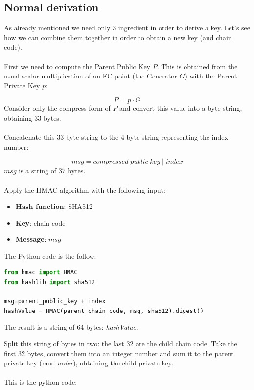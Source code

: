 \subsection{Normal derivation}

As already mentioned we need only 3 ingredient in order to derive a key. Let's see how we can combine them together in order to obtain a new key (and chain code). \\ \\
First we need to compute the Parent Public Key $P$. This is obtained from the usual scalar multiplication of an EC point (the Generator $G$) with the Parent Private Key $p$:

\begin{equation*}
P=p\cdot G
\end{equation*}
Consider only the compress form of $P$ and convert this value into a byte string, obtaining 33 bytes.
\\ \\
Concatenate this 33 byte string to the 4 byte string representing the index number:

\begin{equation*}
msg = compressed \; public\;key \;|\; index
\end{equation*}
$msg$ is a string of $37$ bytes. \\ \\
Apply the HMAC algorithm with the following input:

\begin{itemize}[label=$\odot$]
	\item \textbf{Hash function}: SHA512
	\item \textbf{Key}: chain code
	\item \textbf{Message}: $msg$
\end{itemize}
The Python code is the follow:
\begin{lstlisting}[language=Python]
from hmac import HMAC
from hashlib import sha512

msg=parent_public_key + index
hashValue = HMAC(parent_chain_code, msg, sha512).digest()
\end{lstlisting}
\begin{flushleft}
	The result is a string of 64 bytes: \textit{hashValue}.
\end{flushleft}
Split this string of bytes in two: the last 32 are the child chain code. Take the first 32 bytes, convert them into an integer number and sum it to the parent private key (mod \textit{order}), obtaining the child private key.\\ \\
This is the python code:

